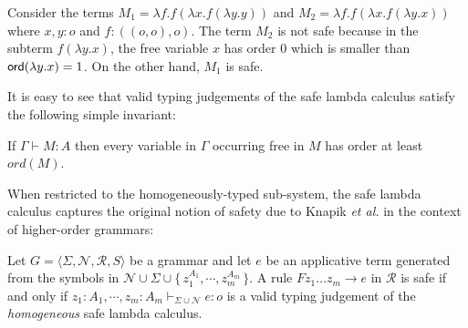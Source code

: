 \documentclass{llncs}
\newcommand\rulef[2]{\frac{\dps #1}{\dps #2}}
\newcommand\ord[1]{{\sf
    ord}(#1)} \newcommand\typear{\rightarrow}
\newcommand{\makeset}[1]{\{\,{#1}\,\}}
\begin{document}
\begin{example}
\label{ex:kierstead}
Consider the terms $M_1 = \lambda f . f (\lambda x . f (\lambda y . y
))$ and $M_2 = \lambda f . f (\lambda x . f (\lambda y .x ))$ where
$x,y:o$ and $f:((o,o),o)$. The term $M_2$ is not safe because in the
subterm $f (\lambda y . x)$, the free variable $x$ has order $0$ which
is smaller than $\ord{\lambda y . x} = 1$.  On the other hand, $M_1$
is safe.
\end{example}

It is easy to see that valid typing judgements of the safe lambda
calculus satisfy the following simple invariant:
\begin{lemma}
\label{lem:ordfreevar}
If $\Gamma \vdash M : A$ then every variable in $\Gamma$ occurring
free in $M$ has order at least $ord(M)$.
\end{lemma}


When restricted to the homogeneously-typed
sub-system, the safe lambda calculus captures the original notion
of safety due to Knapik \emph{et al.} in the context of higher-order
grammars:

\begin{proposition} Let $G = \langle \Sigma, \mathcal{N}, \mathcal{R},
  S \rangle$ be a grammar and let $e$ be an applicative term generated
  from the symbols in $\mathcal{N} \cup \Sigma \cup \makeset{z_1^{A_1},
    \cdots, z_m^{A_m}}$.  A rule $F z_1 \ldots z_m \rightarrow e$ in
  $\mathcal{R}$ is safe if and only if $ z_1 : A_1, \cdots, z_m : A_m
  \vdash_{\Sigma \cup \mathcal{N}} e : o$ is a valid typing judgement
  of the \emph{homogeneous} safe lambda calculus.
\end{proposition}
\end{document}
